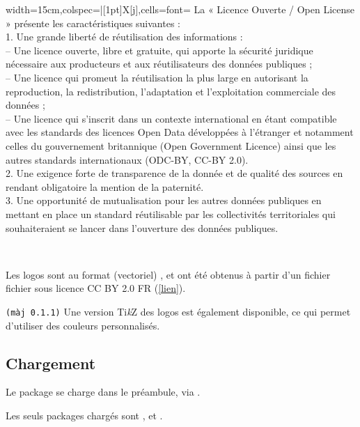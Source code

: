 \documentclass[french,11pt,a4paper]{article}
\providecommand\tikzlogo{Ti\textit{k}Z}
\let\TikZ\tikzlogo
\begin{document}
\hfill
\begin{tblr}{width=15cm,colspec={|[1pt]X[j]},cells={font=\footnotesize}}
	La « Licence Ouverte / Open License » présente les caractéristiques suivantes :\\
	1. Une grande liberté de réutilisation des informations :\\
	-- Une licence ouverte, libre et gratuite, qui apporte la sécurité juridique nécessaire aux producteurs et aux réutilisateurs des données publiques ;\\
	-- Une licence qui promeut la réutilisation la plus large en autorisant la reproduction, la redistribution, l’adaptation et l’exploitation commerciale des données ;\\
	-- Une licence qui s’inscrit dans un contexte international en étant compatible avec les standards des licences Open Data développées à l’étranger et notamment celles du gouvernement britannique (Open Government Licence) ainsi que les autres standards internationaux (ODC-BY, CC-BY 2.0).\\
	2. Une exigence forte de transparence de la donnée et de qualité des sources en rendant obligatoire la mention de la paternité.\\
	3. Une opportunité de mutualisation pour les autres données publiques en mettant en place un standard réutilisable par les collectivités territoriales qui souhaiteraient se lancer dans l’ouverture des données publiques.\\
\end{tblr}
\hfill~

\medskip

Les logos sont au format (vectoriel) , et ont été obtenus à partir d'un fichier fichier  sous licence CC BY 2.0 FR (\href{https://fr.m.wikipedia.org/wiki/Fichier:Logo-licence-ouverte2.svg}{[lien]}).

\smallskip

\texttt{(màj 0.1.1)} Une version \TikZ{} des logos est également disponible, ce qui permet d'utiliser des couleurs personnalisés.

\subsection{Chargement}

Le package se charge dans le préambule, via .

Les seuls packages chargés sont ,  et .
\end{document}
